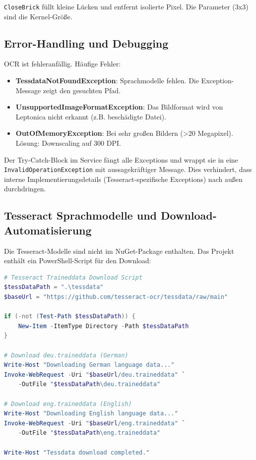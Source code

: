 \texttt{CloseBrick} füllt kleine Lücken und entfernt isolierte Pixel. Die Parameter (3x3) sind die Kernel-Größe.

\subsection{Error-Handling und Debugging}
OCR ist fehleranfällig. Häufige Fehler:

\begin{itemize}
    \item \textbf{TessdataNotFoundException}: Sprachmodelle fehlen. Die Exception-Message zeigt den gesuchten Pfad.
    \item \textbf{UnsupportedImageFormatException}: Das Bildformat wird von Leptonica nicht erkannt (z.B. beschädigte Datei).
    \item \textbf{OutOfMemoryException}: Bei sehr großen Bildern (>20 Megapixel). Lösung: Downscaling auf 300 DPI.
\end{itemize}

Der Try-Catch-Block im Service fängt alle Exceptions und wrappt sie in eine \texttt{InvalidOperationException} mit aussagekräftiger Message. Dies verhindert, dass interne Implementierungsdetails (Tesseract-spezifische Exceptions) nach außen durchdringen.

\subsection{Tesseract Sprachmodelle und Download-Automatisierung}
Die Tesseract-Modelle sind nicht im NuGet-Package enthalten. Das Projekt enthält ein PowerShell-Script für den Download:

\begin{lstlisting}[language=powershell, caption={download-tessdata.ps1 (Auszug)}, label={lst:tessdata_download}]
# Tesseract Traineddata Download Script
$tessDataPath = ".\tessdata"
$baseUrl = "https://github.com/tesseract-ocr/tessdata/raw/main"

if (-not (Test-Path $tessDataPath)) {
    New-Item -ItemType Directory -Path $tessDataPath
}

# Download deu.traineddata (German)
Write-Host "Downloading German language data..."
Invoke-WebRequest -Uri "$baseUrl/deu.traineddata" `
    -OutFile "$tessDataPath\deu.traineddata"

# Download eng.traineddata (English)
Write-Host "Downloading English language data..."
Invoke-WebRequest -Uri "$baseUrl/eng.traineddata" `
    -OutFile "$tessDataPath\eng.traineddata"

Write-Host "Tessdata download completed."
\end{lstlisting}


